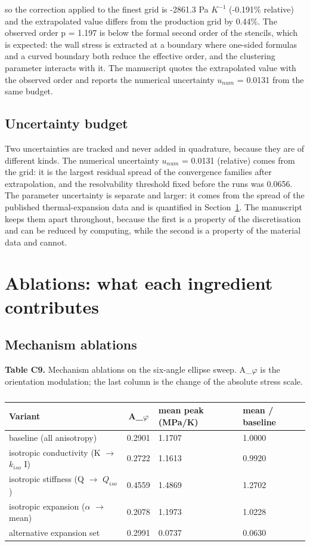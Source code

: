 \documentclass[preprint,12pt]{elsarticle}
\begin{document}
so the correction applied to the finest grid is -2861.3 Pa $K^{-1}$ (-0.191\% relative) and the extrapolated value differs from the production grid by 0.44\%. The observed order p = 1.197 is below the formal second order of the stencils, which is expected: the wall stress is extracted at a boundary where one-sided formulas and a curved boundary both reduce the effective order, and the clustering parameter interacts with it. The manuscript quotes the extrapolated value with the observed order and reports the numerical uncertainty $u_{num}$ = 0.0131 from the same budget.

\subsection{Uncertainty budget}
\label{sec:9.5}

Two uncertainties are tracked and never added in quadrature, because they are of different kinds. The numerical uncertainty $u_{num}$ = 0.0131 (relative) comes from the grid: it is the largest residual spread of the convergence families after extrapolation, and the resolvability threshold fixed before the runs was 0.0656. The parameter uncertainty is separate and larger: it comes from the spread of the published thermal-expansion data and is quantified in Section~\ref{sec:10}. The manuscript keeps them apart throughout, because the first is a property of the discretisation and can be reduced by computing, while the second is a property of the material data and cannot.

\section{Ablations: what each ingredient contributes}
\label{sec:10}

\subsection{Mechanism ablations}
\label{sec:10.1}

\textbf{Table C9.} Mechanism ablations on the six-angle ellipse sweep. A\_$\varphi$ is the orientation modulation; the last column is the change of the absolute stress scale.

\begin{table}[htbp]
\centering
\caption{}
\label{tab:?}
\begin{tabularx}{\textwidth}{Xcll}
\toprule
Variant & A\_$\varphi$ & mean peak (MPa/K) & mean / baseline \\
\midrule
baseline (all anisotropy) & 0.2901 & 1.1707 & 1.0000 \\
isotropic conductivity (K $\to$ $k_{iso}$ I) & 0.2722 & 1.1613 & 0.9920 \\
isotropic stiffness (Q $\to$ $Q_{iso}$) & 0.4559 & 1.4869 & 1.2702 \\
isotropic expansion ($\alpha$ $\to$ mean) & 0.2078 & 1.1973 & 1.0228 \\
alternative expansion set \cite{huang2025} & 0.2991 & 0.0737 & 0.0630 \\
\bottomrule
\end{tabularx}
\end{table}
\end{document}
